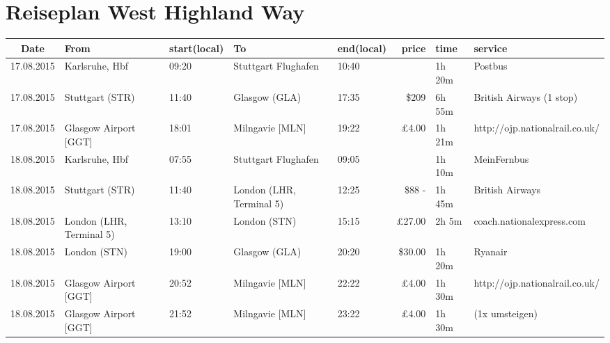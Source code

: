 \documentclass[a4paper, landscape]{scrartcl}
\begin{document}
\clearpage
\section*{Reiseplan West Highland Way}
\vspace*{\fill}
    \begin{table}[ht]
        \centering
        \begin{tabular}{cl p{2cm} l p{2cm} rl p{5cm}}
        \toprule
    \textbf{Date}  & \textbf{From}        & \textbf{start\newline (local)} & \textbf{To} & \textbf{end\newline (local)} & \textbf{price} & \textbf{time} & \textbf{service} \\ \midrule
    17.08.2015 & Karlsruhe, Hbf           & 09:20          & Stuttgart Flughafen      & 10:40        & \EUR 4.50      & 1h 20m & Postbus      \\
    17.08.2015 & Stuttgart (STR)          & 11:40          & Glasgow (GLA)            & 17:35        & \$209          & 6h 55m & British Airways (1 stop) \\
    17.08.2015 & Glasgow Airport [GGT]    & 18:01          & Milngavie [MLN]          & 19:22        &    £4.00       & 1h 21m & http://ojp.nationalrail.co.uk/      \\
    \midrule
    18.08.2015 & Karlsruhe, Hbf           & 07:55          & Stuttgart Flughafen      & 09:05        & \EUR 5.00      & 1h 10m & MeinFernbus      \\
    18.08.2015 & Stuttgart (STR)          & 11:40          & London (LHR, Terminal 5) & 12:25        & \$88 - \EUR 100.00 & 1h 45m & British Airways \\
    18.08.2015 & London (LHR, Terminal 5) & 13:10          & London (STN)             & 15:15        &   £27.00       & 2h 5m  & coach.nationalexpress.com           \\
    18.08.2015 & London (STN)             & 19:00          & Glasgow (GLA)            & 20:20        &  \$30.00       & 1h 20m & Ryanair                             \\
    18.08.2015 & Glasgow Airport [GGT]    & 20:52          & Milngavie [MLN]          & 22:22        &    £4.00       & 1h 30m & http://ojp.nationalrail.co.uk/      \\
    18.08.2015 & Glasgow Airport [GGT]    & 21:52          & Milngavie [MLN]          & 23:22        &    £4.00       & 1h 30m & (1x umsteigen)                      \\\midrule\midrule

\end{tabular}
\end{table}
\end{document}
